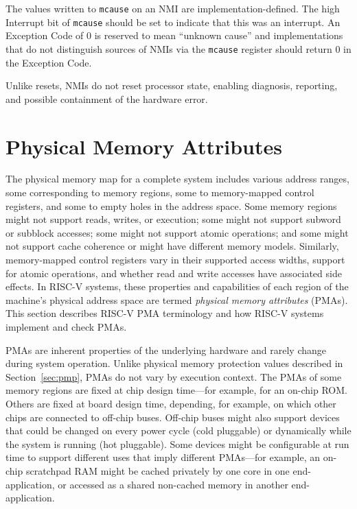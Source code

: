 The values written to {\tt mcause} on an NMI are
implementation-defined.  The high Interrupt bit of {\tt mcause} should
be set to indicate that this was an interrupt.  An Exception Code of 0
is reserved to mean ``unknown cause'' and implementations that do not
distinguish sources of NMIs via the {\tt mcause} register should
return 0 in the Exception Code.

Unlike resets, NMIs do not reset processor state, enabling diagnosis,
reporting, and possible containment of the hardware error.

\section{Physical Memory Attributes}
\label{sec:pma}

The physical memory map for a complete system includes various address
ranges, some corresponding to memory regions, some to memory-mapped
control registers, and some to empty holes in the address space.  Some
memory regions might not support reads, writes, or execution; some
might not support subword or subblock accesses; some might not support
atomic operations; and some might not support cache coherence or might
have different memory models.  Similarly, memory-mapped control
registers vary in their supported access widths, support for atomic
operations, and whether read and write accesses have associated side
effects.  In RISC-V systems, these properties and capabilities of each
region of the machine's physical address space are termed {\em
  physical memory attributes} (PMAs).  This section describes RISC-V
PMA terminology and how RISC-V systems implement and check PMAs.

PMAs are inherent properties of the underlying hardware and rarely
change during system operation.  Unlike physical memory protection
values described in Section~\ref{sec:pmp}, PMAs do not vary by
execution context.  The PMAs of some memory regions are fixed at chip
design time---for example, for an on-chip ROM.  Others are fixed at
board design time, depending, for example, on which other chips are
connected to off-chip buses.  Off-chip buses might also support
devices that could be changed on every power cycle (cold pluggable) or
dynamically while the system is running (hot pluggable).  Some devices
might be configurable at run time to support different uses that imply
different PMAs---for example, an on-chip scratchpad RAM might be
cached privately by one core in one end-application, or accessed as a
shared non-cached memory in another end-application.

